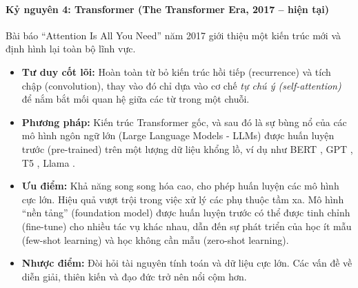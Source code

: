 \paragraph{Kỷ nguyên 4: Transformer (The Transformer Era, 2017 -- hiện tại)}
Bài báo “Attention Is All You Need” \cite{vaswani2017attention} năm 2017 giới thiệu một kiến trúc mới và định hình lại toàn bộ lĩnh vực.
\begin{itemize}
    \item \textbf{Tư duy cốt lõi:} Hoàn toàn từ bỏ kiến trúc hồi tiếp (recurrence) và tích chập (convolution), thay vào đó chỉ dựa vào cơ chế \textit{tự chú ý (self-attention)} để nắm bắt mối quan hệ giữa các từ trong một chuỗi.
    \item \textbf{Phương pháp:} Kiến trúc Transformer gốc, và sau đó là sự bùng nổ của các mô hình ngôn ngữ lớn (Large Language Models - LLMs) được huấn luyện trước (pre-trained) trên một lượng dữ liệu khổng lồ, ví dụ như BERT \cite{devlin2018bert}, GPT \cite{radford2018improving,radford2019language,brown2020language}, T5 \cite{raffel2020exploring}, Llama \cite{touvron2023llama}.
    \item \textbf{Ưu điểm:} Khả năng song song hóa cao, cho phép huấn luyện các mô hình cực lớn. Hiệu quả vượt trội trong việc xử lý các phụ thuộc tầm xa. Mô hình “nền tảng” (foundation model) được huấn luyện trước có thể được tinh chỉnh (fine-tune) cho nhiều tác vụ khác nhau, dẫn đến sự phát triển của học ít mẫu (few-shot learning) và học không cần mẫu (zero-shot learning).
    \item \textbf{Nhược điểm:} Đòi hỏi tài nguyên tính toán và dữ liệu cực lớn. Các vấn đề về diễn giải, thiên kiến và đạo đức trở nên nổi cộm hơn.
\end{itemize}